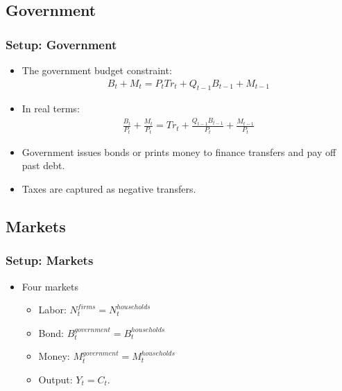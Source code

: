 \documentclass[english,xcolor=svgnames]{beamer}
\begin{document}
\subsection{Government}

\begin{frame}
\frametitle{Setup: Government}
\begin{itemize}
	\item The government budget constraint:
	\begin{align*}
		B_t + M_t = P_t Tr_t + Q_{t-1}B_{t-1} + M_{t-1}
	\end{align*}
	\item In real terms:
	\begin{align*}
		\frac{B_t}{P_t} + \frac{M_t}{P_t} =  Tr_t + \frac{Q_{t-1}B_{t-1}}{P_t} + \frac{M_{t-1}}{P_t}
	\end{align*}
	\item Government issues bonds or prints money to finance transfers and pay off past debt.
	\item Taxes are captured as negative transfers.
\end{itemize}
\end{frame}


\subsection{Markets}

\begin{frame}
\frametitle{Setup: Markets}
\begin{itemize}
	\item Four markets
	\begin{itemize}
		\item Labor: $N_t^{firms}=N_{t}^{households}$
		\item Bond: $B_t^{government}=B_{t}^{households}$
		\item Money: $M_t^{government}=M_t^{households}$
		\item Output: $Y_t=C_t$.
	\end{itemize}
\end{itemize}
\end{frame}
\end{document}
